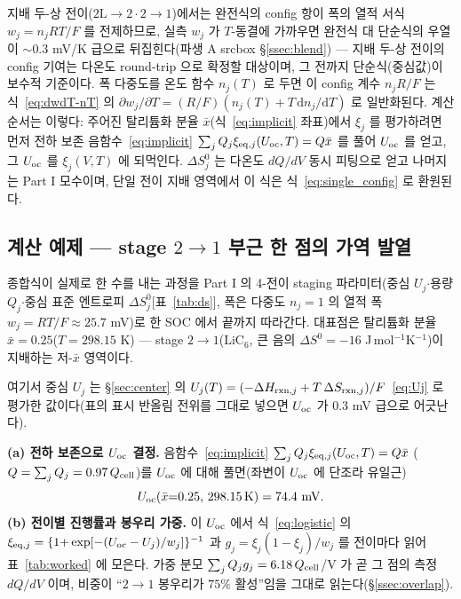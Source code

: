지배 두-상 전이($2\mathrm L\!\to\!2\cdot2\!\to\!1$)에서는 완전식의 config 항이 폭의 열적 서식 $w_j=n_jRT/F$ 를
전제하므로, 실측 $w_j$ 가 $T$-동결에 가까우면 완전식 대 단순식의 우열이 $\sim$0.3 mV/K 급으로 뒤집힌다(파생 A
srcbox \S\ref{ssec:blend}) --- 지배 두-상 전이의 config 기여는 다온도 round-trip 으로 확정할 대상이며, 그
전까지 단순식(중심값)이 보수적 기준이다. 폭 다중도를 온도 함수 $n_j(T)$ 로 두면 이 config 계수 $n_jR/F$ 는
식~\eqref{eq:dwdT-nT} 의 $\partial w_j/\partial T=(R/F)(n_j(T)+T\,\mathrm{d}n_j/\mathrm{d}T)$ 로 일반화된다.
계산 순서는 이렇다: 주어진 탈리튬화 분율 $\bar x$(식~\eqref{eq:implicit} 좌표)에서 $\xi_j$ 를 평가하려면 먼저
전하 보존 음함수~\eqref{eq:implicit} $\sum_j Q_j\xi_{\mathrm{eq},j}(U_{\mathrm{oc}},T)=Q\bar x$ 를 풀어 $U_{\mathrm{oc}}$ 를 얻고, 그
$U_{\mathrm{oc}}$ 를 $\xi_j(V,T)$ 에 되먹인다. $\Delta S^0_j$ 는 다온도 $dQ/dV$ 동시 피팅으로 얻고 나머지는 Part I
모수이며, 단일 전이 지배 영역에서 이 식은 식~\eqref{eq:single_config} 로 환원된다.

\subsection{계산 예제 --- stage $2\!\to\!1$ 부근 한 점의 가역 발열}\label{ssec:worked}
종합식이 실제로 한 수를 내는 과정을 Part I 의 4-전이 staging 파라미터(중심 $U_j$$\cdot$용량 $Q_j$$\cdot$중심
표준 엔트로피 $\Delta S^0_j$[표~\ref{tab:ds}], 폭은 다중도 $n_j{=}1$ 의 열적 폭 $w_j{=}RT/F\!\approx\!25.7$ mV)로
한 SOC 에서 끝까지 따라간다. 대표점은 탈리튬화 분율 $\bar x=0.25$($T=298.15$ K) --- stage
$2\!\to\!1$($\mathrm{LiC_6}$, 큰 음의 $\Delta S^0=-16$ J\,mol$^{-1}$K$^{-1}$)이 지배하는 저-$\bar x$ 영역이다.

여기서 중심 $U_j$ 는 \S\ref{sec:center} 의 $U_j(T)=(-\Delta H_{\mathrm{rxn},j}+T\,\Delta S_{\mathrm{rxn},j})/F$~\eqref{eq:Uj} 로 평가한
값이다(표의 표시 반올림 전위를 그대로 넣으면 $U_{\mathrm{oc}}$ 가 $0.3$ mV 급으로 어긋난다).

\textbf{(a) 전하 보존으로 $U_{\mathrm{oc}}$ 결정.} 음함수~\eqref{eq:implicit} $\sum_jQ_j\xi_{\mathrm{eq},j}(U_{\mathrm{oc}},T)=Q\bar x$
($Q=\sum_jQ_j=0.97\,Q_{\mathrm{cell}}$)를 $U_{\mathrm{oc}}$ 에 대해 풀면(좌변이 $U_{\mathrm{oc}}$ 에 단조라 유일근)
\begin{equation*}
U_\oc(\bar x{=}0.25,\,298.15\,\mathrm K)=74.4\ \mathrm{mV}.
\end{equation*}
\textbf{(b) 전이별 진행률과 봉우리 가중.} 이 $U_{\mathrm{oc}}$ 에서 식~\eqref{eq:logistic} 의
$\xi_{\mathrm{eq},j}=\{1{+}\exp[-(U_{\mathrm{oc}}-U_j)/w_j]\}^{-1}$ 과 $g_j=\xi_j(1-\xi_j)/w_j$ 를 전이마다 읽어 표~\ref{tab:worked}
에 모은다. 가중 분모 $\sum_jQ_jg_j=6.18\,Q_{\mathrm{cell}}$/V 가 곧 그 점의 측정 $dQ/dV$ 이며, 비중이 ``$2\!\to\!1$
봉우리가 $75\%$ 활성''임을 그대로 읽는다(\S\ref{ssec:overlap}).

